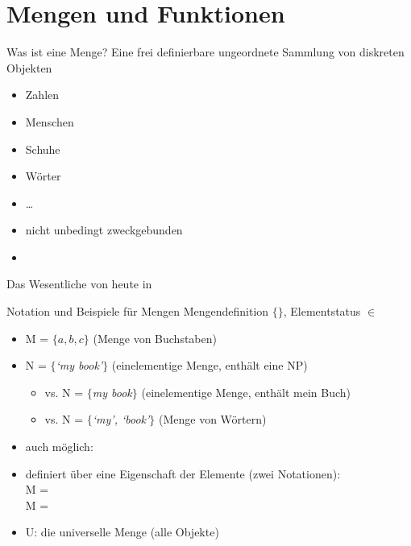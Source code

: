 \section{Mengen und Funktionen}

\begin{frame}
  {Was ist eine Menge?}
  \onslide<+->
  \onslide<+->
  Eine \alert{frei definierbare ungeordnete Sammlung von diskreten Objekten}\\
  \begin{itemize}[<+->]
    \item Zahlen
    \item Menschen
    \item Schuhe
    \item Wörter
    \item \ldots
      \Halbzeile
    \item nicht unbedingt zweckgebunden
    \item {}
  \end{itemize}
  \centering
  \Zeile
  \onslide<+->
  Das Wesentliche von heute in \citet[Kapitel~1--4]{ParteeEa1990}
\end{frame}

\begin{frame}
  {Notation und Beispiele für Mengen}
  \onslide<+->
  \onslide<+->
  Mengendefinition \alert{$\{\}$}, Elementstatus $\in$\\
  \Zeile
  \begin{itemize}[<+->]
    \item M = \alert{$\{a,b,c\}$} (Menge von Buchstaben)
      \Halbzeile
    \item N = \alert{$\{$\textit{`my book'}$\}$} (einelementige Menge, enthält eine NP)
      \begin{itemize}[<+->]
        \item vs. \alert{N = $\{$\textit{my book}$\}$} (einelementige Menge, enthält mein Buch)
        \item vs. \alert{N = $\{$\textit{`my', `book'}$\}$} (Menge von Wörtern)
      \end{itemize}
      \Halbzeile
    \item auch möglich: 
      \Halbzeile
    \item definiert über eine Eigenschaft der Elemente (zwei Notationen):\\
      M = \\
      M = 
      \Halbzeile
    \item \alert{U}: die universelle Menge (alle Objekte)
  \end{itemize}
\end{frame}

